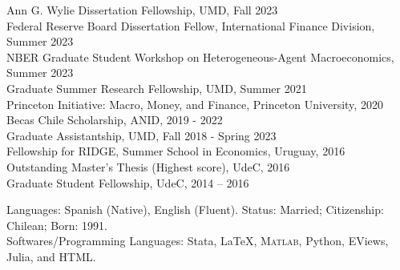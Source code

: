 \documentclass[10pt]{article}
\providecommand\Matlab{\textsc{Matlab}}
\begin{document}
\begin{description}[leftmargin=10em,style=nextline]
  \item[Grants and Awards] Ann G. Wylie Dissertation Fellowship, UMD, Fall 2023 \\
  Federal Reserve Board Dissertation Fellow, International Finance Division, Summer 2023 \\
  NBER Graduate Student Workshop on Heterogeneous-Agent Macroeconomics,  Summer 2023\\
  Graduate Summer Research Fellowship, UMD, Summer 2021\\
  Princeton Initiative: Macro, Money, and Finance,  Princeton University, 2020\\
  Becas Chile Scholarship, ANID, 2019 - 2022\\
  Graduate Assistantship, UMD, Fall 2018 - Spring 2023\\
  Fellowship for RIDGE, Summer School in Economics,  Uruguay, 2016\\
  Outstanding Master's Thesis (Highest score), UdeC, 2016\\
  Graduate Student Fellowship, UdeC, 2014 -- 2016\\[-.1in]
  \item[Others] Languages: Spanish (Native), English (Fluent). Status: Married; Citizenship: Chilean; Born: 1991.\\
  Softwares/Programming Languages: Stata, \LaTeX, \Matlab, Python, EViews, Julia, and HTML.\\
  \end{description}



%
%
%

\end{document}
